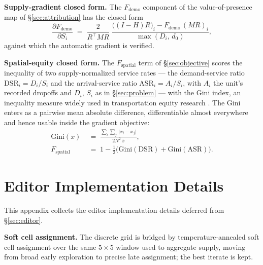 \textbf{Supply-gradient closed form.} The $F_{\mathrm{demo}}$ component of
the value-of-presence map of \S\ref{sec:attribution} has the closed form
\begin{equation}\label{eq:supply-grad}
\frac{\partial F_{\mathrm{demo}}}{\partial S_i}
\;=\; \frac{2}{R^{\top}MR}\;
\frac{\bigl((I-H)R\bigr)_i - F_{\mathrm{demo}}\,(MR)_i}{\max(D_i,\, d_0)},
\end{equation}
against which the automatic gradient is verified.

\textbf{Spatial-equity closed form.} The $F_{\mathrm{spatial}}$ term of
\S\ref{sec:objective} scores the inequality of two supply-normalized service
rates --- the demand-service ratio $\mathrm{DSR}_i = D_i / S_i$ and the
arrival-service ratio $\mathrm{ASR}_i = A_i / S_i$, with $A_i$ the unit's
recorded dropoffs and $D_i$, $S_i$ as in \S\ref{sec:problem} --- with the
Gini index, an inequality measure widely used in transportation equity
research \cite{horchergraham2021,karner2024}. The Gini enters as a pairwise
mean absolute difference, differentiable almost everywhere and hence usable
inside the gradient objective:
\begin{equation}\label{eq:fspatial}
\begin{split}
\mathrm{Gini}(x) &\;=\; \frac{\sum_{i}\sum_{j}\,\lvert x_i - x_j\rvert}
{2N^{2}\,\bar{x}},\\
F_{\mathrm{spatial}} &\;=\; 1 - \tfrac{1}{2}\bigl(\mathrm{Gini}(\mathrm{DSR})
+ \mathrm{Gini}(\mathrm{ASR})\bigr).
\end{split}
\end{equation}

\section{Editor Implementation Details}\label{app:editor}

This appendix collects the editor implementation details deferred from
\S\ref{sec:editor}.

\textbf{Soft cell assignment.} The discrete grid is bridged by
tem\-per\-a\-ture-annealed soft cell assignment
\cite{jang2017gumbel,maddison2017concrete,bengio2013ste} over the same
$5{\times}5$ window used to aggregate supply, moving from broad early
exploration to precise late assignment; the best iterate is kept.

